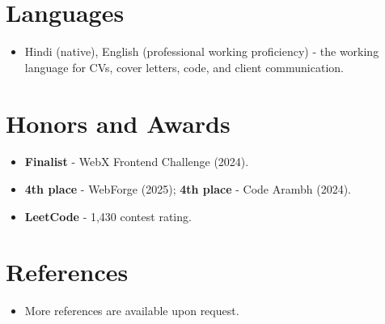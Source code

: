 \documentclass[11pt,a4paper,sans]{moderncv}
\begin{document}

\section{Languages}
\vspace{1pt}
\begin{itemize}
\item {Hindi (native), English (professional working proficiency) - the working language for CVs, cover letters, code, and client communication.}
\end{itemize}


\section{Honors and Awards}
\vspace{1pt}
\begin{itemize}
\item{\textbf{Finalist} - WebX Frontend Challenge (2024).}
\item{\textbf{4th place} - WebForge (2025); \textbf{4th place} - Code Arambh (2024).}
\item{\textbf{LeetCode} - 1,430 contest rating.}
\end{itemize}


\section{References}
\vspace{1pt}
\begin{itemize}
\item{More references are available upon request.}
\end{itemize}
\end{document}

